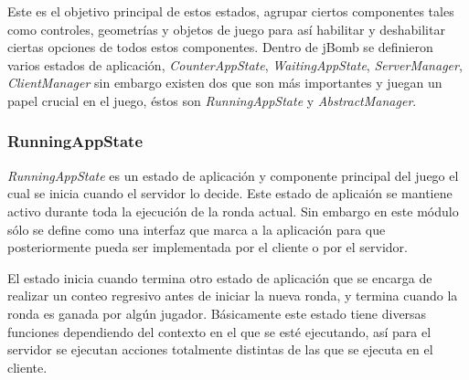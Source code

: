 \documentclass[a4paper,12pt,openany,oneside]{book}
\begin{document}
Este es el objetivo principal de estos estados, agrupar ciertos componentes tales como controles, geometrías y objetos de juego para así habilitar y deshabilitar ciertas opciones de todos estos componentes. Dentro de jBomb se definieron varios estados de aplicación, \textit{CounterAppState}, \textit{WaitingAppState}, \textit{ServerManager}, \textit{ClientManager} sin embargo existen dos que son más importantes y juegan un papel crucial en el juego, éstos son \textit{RunningAppState} y \textit{AbstractManager}.
\subsubsection{RunningAppState}
\textit{RunningAppState} es un estado de aplicación y componente principal del juego el cual se inicia cuando el servidor lo decide. Este estado de aplicaión se mantiene activo durante toda la ejecución de la ronda actual. Sin embargo en este módulo sólo se define como una interfaz que marca a la aplicación para que posteriormente pueda ser implementada por el cliente o por el servidor.

El estado inicia cuando termina otro estado de aplicación que se encarga de realizar un conteo regresivo antes de iniciar la nueva ronda, y termina cuando la ronda es ganada por algún jugador. Básicamente este estado tiene diversas funciones dependiendo del contexto en el que se esté ejecutando, así para el servidor se ejecutan acciones totalmente distintas de las que se ejecuta en el cliente.
\end{document}
